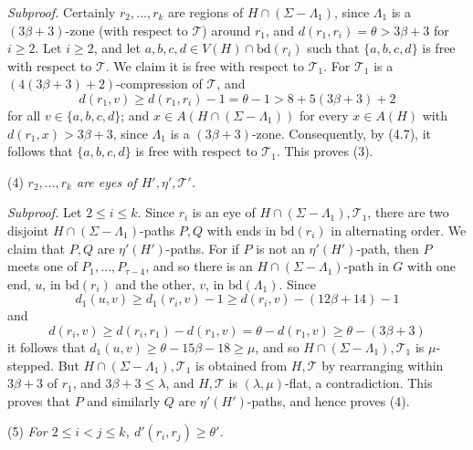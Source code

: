 \textit{Subproof.} Certainly $r_2, \dots, r_k$ are regions of $H \cap (\Sigma - \Lambda_1)$, since $\Lambda_1$ is a $(3\beta + 3)$-zone (with respect to $\mathcal{T}$) around $r_1$, and $d(r_1, r_i) = \theta > 3\beta + 3$ for $i \ge 2$. Let $i \ge 2$, and let $a, b, c, d \in V(H) \cap \text{bd}(r_i)$ such that $\{a, b, c, d\}$ is free with respect to $\mathcal{T}$. We claim it is free with respect to $\mathcal{T}_1$. For $\mathcal{T}_1$ is a $(4(3\beta + 3) + 2)$-compression of $\mathcal{T}$, and
\begin{equation*}
d(r_1, v) \ge d(r_1, r_i) - 1 = \theta - 1 > 8 + 5(3\beta + 3) + 2
\end{equation*}
for all $v \in \{a, b, c, d\}$; and $x \in A(H \cap (\Sigma - \Lambda_1))$ for every $x \in A(H)$ with $d(r_1, x) > 3\beta + 3$, since $\Lambda_1$ is a $(3\beta + 3)$-zone. Consequently, by (4.7), it follows that $\{a, b, c, d\}$ is free with respect to $\mathcal{T}_1$. This proves (3).

\hspace*{12pt}(4) \textit{$r_2, \dots, r_k$ are eyes of $H', \eta', \mathcal{T}'$.}

\textit{Subproof.} Let $2 \le i \le k$. Since $r_i$ is an eye of $H \cap (\Sigma - \Lambda_1), \mathcal{T}_1$, there are two disjoint $H \cap (\Sigma - \Lambda_1)$-paths $P, Q$ with ends in $\text{bd}(r_i)$ in alternating order. We claim that $P, Q$ are $\eta'(H')$-paths. For if $P$ is not an $\eta'(H')$-path, then $P$ meets one of $P_1, \dots, P_{\tau - 4}$, and so there is an $H \cap (\Sigma - \Lambda_1)$-path in $G$ with one end, $u$, in $\text{bd}(r_i)$ and the other, $v$, in $\text{bd}(\Lambda_1)$. Since
\begin{equation*}
d_1(u, v) \ge d_1(r_i, v) - 1 \ge d(r_i, v) - (12\beta + 14) - 1
\end{equation*}
and
\begin{equation*}
d(r_i, v) \ge d(r_i, r_1) - d(r_1, v) = \theta - d(r_1, v) \ge \theta - (3\beta + 3)
\end{equation*}
it follows that $d_1(u, v) \ge \theta - 15\beta - 18 \ge \mu$, and so $H \cap (\Sigma - \Lambda_1), \mathcal{T}_1$ is $\mu$-stepped. But $H \cap (\Sigma - \Lambda_1), \mathcal{T}_1$ is obtained from $H, \mathcal{T}$ by rearranging within $3\beta + 3$ of $r_1$, and $3\beta + 3 \le \lambda$, and $H, \mathcal{T}$ is $(\lambda, \mu)$-flat, a contradiction. This proves that $P$ and similarly $Q$ are $\eta'(H')$-paths, and hence proves (4).

\hspace*{12pt}(5) \textit{For $2 \le i < j \le k$, $d'(r_i, r_j) \ge \theta'$.}

